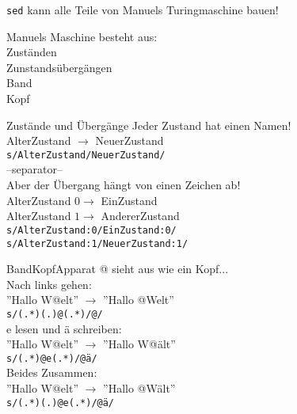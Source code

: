 \documentclass[aspectratio=169]{beamer}
\begin{document}
\begin{frame}{ {\tt sed} kann alle Teile von Manuels Turingmaschine bauen!}

	Manuels Maschine besteht aus:\\\pause
	Zust\"anden\\\pause
	Zunstands\"uberg\"angen\\\pause
	Band\\\pause
	Kopf\\
\end{frame}

\begin{frame}{ Zust\"ande und \"Uberg\"ange }
	Jeder Zustand hat einen Namen!\\\pause
	AlterZustand $\rightarrow$ NeuerZustand  %
	\\\pause
	{\tt s/AlterZustand/NeuerZustand/} \only<3>{(duh !)}
	\\\pause
	--separator--\\
	Aber der \"Ubergang h\"angt von einen Zeichen ab!\\\pause
	AlterZustand $0\rightarrow$ EinZustand \\ %
	AlterZustand $1\rightarrow$ AndererZustand \\ %
	\pause
	{\tt s/AlterZustand:0/EinZustand:0/}\\
	{\tt s/AlterZustand:1/NeuerZustand:1/}\\
\end{frame}

\begin{frame}{BandKopfApparat}
	@ sieht aus wie ein Kopf...\\\pause %
	Nach links gehen:\\
	''Hallo W@elt'' $\rightarrow$ ''Hallo @Welt''\\\pause
	\texttt{s/(.*)(.)@(.*)/@/}\\\pause
	e lesen und \"a schreiben:\\
	''Hallo W@elt'' $\rightarrow$ ''Hallo W@\"alt''\\\pause
	\texttt{s/(.*)@e(.*)/@\"a/}\\\pause
	Beides Zusammen:\\
	''Hallo W@elt'' $\rightarrow$ ''Hallo @W\"alt''\\\pause
	\texttt{s/(.*)(.)@e(.*)/@\"a/}\\
\end{frame}
\end{document}
